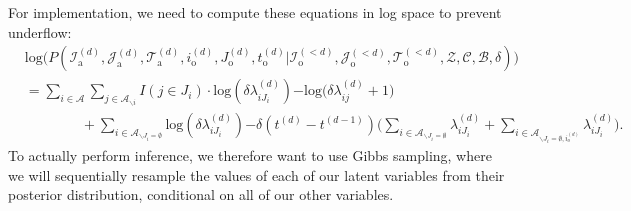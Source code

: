 \documentclass[a4paper]{article}
\begin{document}
For implementation, we need to compute these equations in log space to prevent underflow:
 \begin{equation}
 \begin{aligned}
 &\mbox{log}\Big(P(\mathcal{I}^{(d)}_{\mbox{a}}, \mathcal{J}^{(d)}_{\mbox{a}}, \mathcal{T}^{(d)}_{\mbox{a}}, i^{(d)}_{\mbox{o}}, J^{(d)}_{\mbox{o}}, t^{(d)}_{\mbox{o}} |\mathcal{I}^{(<d)}_{\mbox{o}}, \mathcal{J}^{(<d)}_{\mbox{o}}, \mathcal{T}^{(<d)}_{\mbox{o}}, \mathcal{Z}, \mathcal{C}, \mathcal{B},  \delta)\Big)\\&=\sum_{i\in \mathcal{A}}\sum_{j \in \mathcal{A}_{\backslash i }} {I(j \in J_i)}\cdot\mbox{log}(\delta\lambda^{(d)}_{iJ_i}) {-\mbox{log}(\delta\lambda^{(d)}_{ij}}+1)\\&\quad\quad\quad\quad + \sum_{i\in \mathcal{A}_{\backslash J_i=\emptyset}} \mbox{log}(\delta\lambda^{(d)}_{iJ_i}){-\delta(t^{(d)}-t^{(d-1)})\Big(\sum\limits_{i \in \mathcal{A}_{\backslash J_i=\emptyset}}\lambda^{(d)}_{i{J_i}}+\sum\limits_{i \in \mathcal{A}_{\backslash J_i=\emptyset, i_o^{(d)}}}\lambda^{(d)}_{i{J_i}}\Big)}.
 \end{aligned}
 \end{equation}
 To actually perform inference, we therefore want to use Gibbs sampling, where we will sequentially resample the values of each of our latent variables from their posterior distribution, conditional on all of our other variables.
\end{document}
